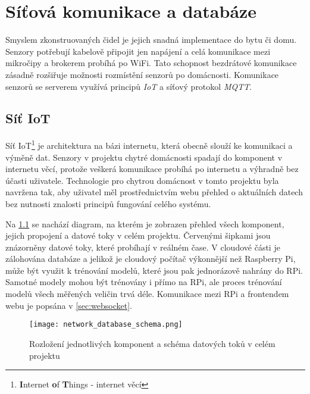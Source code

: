 \chapter{Síťová komunikace a databáze} \label{chap:network_database}
Smyslem zkonstruovaných čidel je jejich snadná implementace do bytu či domu. Senzory potřebují kabelově připojit jen napájení a celá komunikace mezi mikročipy a brokerem probíhá po WiFi. Tato schopnost bezdrátové komunikace zásadně rozšiřuje možnosti rozmístění senzorů po domácnosti. Komunikace senzorů se serverem využívá principů \textit{IoT} a síťový protokol \textit{MQTT}. 

\section*{Síť IoT} \label{sec:iot}
Síť IoT\footnote{\textbf{I}nternet \textbf{o}f \textbf{T}hings - internet věcí} je architektura na bázi internetu, která obecně slouží ke komunikaci a výměně dat. Senzory v projektu chytré domácnosti spadají do komponent v internetu věcí, protože veškerá komunikace probíhá po internetu a výhradně bez účasti uživatele. Technologie pro chytrou domácnost v tomto projektu byla navržena tak, aby uživatel měl prostřednictvím webu přehled o aktuálních datech bez nutnosti znalosti principů fungování celého systému. \par
Na \cref{fig:network_database_schema} se nachází diagram, na kterém je zobrazen přehled všech komponent, jejich propojení a datové toky v celém projektu. Červenými šipkami jsou znázorněny datové toky, které probíhají v reálném čase. V cloudové části je zálohována databáze a jelikož je cloudový počítač výkonnější než Raspberry Pi, může být využit k trénování modelů, které jsou pak jednorázově nahrány do RPi. Samotné modely mohou být trénovány i přímo na RPi, ale proces trénování modelů všech měřených veličin trvá déle. Komunikace mezi RPi a frontendem webu je popsána v \cref{sec:websocket}.

\begin{figure}[H]
  \centering
  \texttt{[image: network\_database\_schema.png]}
  \caption{Rozložení jednotlivých komponent a schéma datových toků v celém projektu}
  \label{fig:network_database_schema}
\end{figure}

